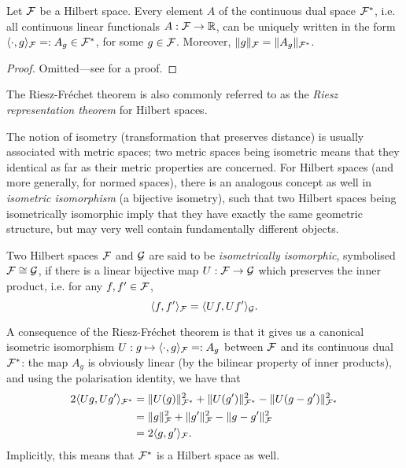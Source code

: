 \begin{theorem}
  Let ${\mathcal F}$ be a Hilbert space.
  Every element $A$ of the continuous dual space ${\mathcal F}^*$, i.e. all continuous linear functionals $A:{\mathcal F}\to\mathbb{R}$, can be uniquely written in the form $\langle\cdot,g\rangle_{\mathcal F} =: A_g \in {\mathcal F}^*$, for some $g\in{\mathcal F}$. 
  Moreover, $\lVert g\rVert_{\mathcal F} = \lVert A_g\rVert_{{\mathcal F}^*}$.
\end{theorem}

\begin{proof}
  Omitted---see \citet[Theorem 4.2.1]{yamamoto2012vector} for a proof.
\end{proof}

\begin{remark}
  The Riesz-Fréchet theorem is also commonly referred to as the \emph{Riesz representation theorem} for Hilbert spaces.
\end{remark}

The notion of isometry (transformation that preserves distance) is usually associated with metric spaces; two metric spaces being isometric means that they identical as far as their metric properties are concerned.
For Hilbert spaces (and more generally, for normed spaces), there is an analogous concept as well in \emph{isometric isomorphism} (a bijective isometry), such that two Hilbert spaces being isometrically isomorphic imply that they have exactly the same geometric structure, but may very well contain fundamentally different objects.

\begin{definition}
  Two Hilbert spaces ${\mathcal F}$ and ${\mathcal G}$ are said to be \emph{isometrically isomorphic}, symbolised ${\mathcal F} \cong {\mathcal G}$, if there is a linear bijective map $U:{\mathcal F}\to{\mathcal G}$ which preserves the inner product, i.e. for any $f,f'\in{\mathcal F}$, 
  \[
    \langle f,f'\rangle_{\mathcal F} = \langle Uf,Uf'\rangle_{\mathcal G}.
  \]
\end{definition}

A consequence of the Riesz-Fréchet theorem is that it gives us a canonical isometric isomorphism $U:g\mapsto \langle\cdot,g\rangle_{\mathcal F} =: A_g$ between ${\mathcal F}$ and its continuous dual ${\mathcal F}^*$:
the map $A_g$ is obviously linear (by the bilinear property of inner products), and using the polarisation identity, we have that
\begin{align*}
  2\langle Ug,Ug'\rangle_{{\mathcal F}^*} 
  &= \lVert U(g)\rVert_{{\mathcal F}^*}^2 + \lVert U(g')\rVert_{{\mathcal F}^*}^2 - \lVert U(g - g')\rVert_{{\mathcal F}^*}^2 \\
  &= \lVert g\rVert_{{\mathcal F}}^2 + \lVert g'\rVert_{{\mathcal F}}^2 - \lVert g-g'\rVert_{{\mathcal F}}^2 \\
  &= 2\langle g,g'\rangle_{{\mathcal F}}.
\end{align*}
Implicitly, this means that ${\mathcal F}^*$ is a Hilbert space as well.

